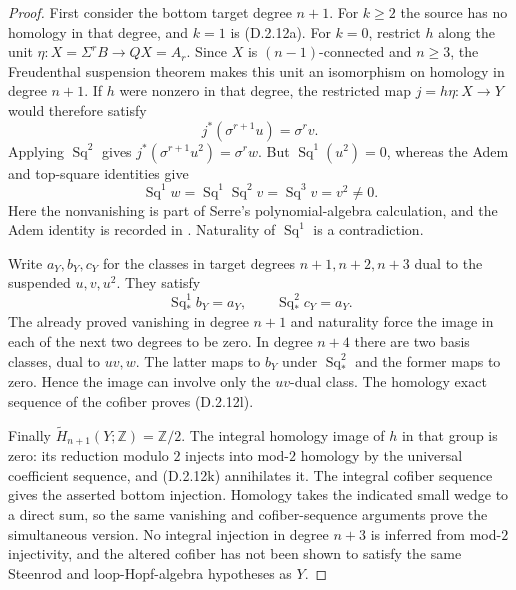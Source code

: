 \begin{proof}
First consider the bottom target degree $n+1$. For $k\geq2$
the source has no homology in that degree, and $k=1$ is
\textup{(D.2.12a)}. For $k=0$, restrict $h$ along the unit
$\eta:X=\Sigma^rB\to QX=A_r$. Since $X$ is
$(n-1)$-connected and $n\geq3$, the Freudenthal suspension
theorem \cite[Corollary~4.24]{FGHHatcher2002} makes this unit an isomorphism on homology in degree
$n+1$. If $h$ were nonzero in that degree, the restricted map
$j=h\eta:X\to Y$ would therefore satisfy
\[
 j^*(\sigma^{r+1}u)=\sigma^rv.
\]
Applying $\operatorname{Sq}^2$ gives
$j^*(\sigma^{r+1}u^2)=\sigma^rw$.
But $\operatorname{Sq}^1(u^2)=0$, whereas the Adem and
top-square identities give
\[
 \operatorname{Sq}^1w
 =\operatorname{Sq}^1\operatorname{Sq}^2v
 =\operatorname{Sq}^3v=v^2\ne0.
\]
Here the nonvanishing is part of Serre's polynomial-algebra
calculation, and the Adem identity is recorded in
\cite[\S4, no.~32.2, p.~224]{I_Serre1953}.
Naturality of $\operatorname{Sq}^1$ is a contradiction.

Write $a_Y,b_Y,c_Y$ for the classes in target degrees
$n+1,n+2,n+3$ dual to the suspended $u,v,u^2$.
They satisfy
\[
 \operatorname{Sq}_*^1b_Y=a_Y,
 \qquad\operatorname{Sq}_*^2c_Y=a_Y.
\]
The already proved vanishing in degree $n+1$ and naturality
force the image in each of the next two degrees to be zero.
In degree $n+4$ there are two basis classes, dual to $uv,w$.
The latter maps to $b_Y$ under $\operatorname{Sq}_*^2$ and
the former maps to zero. Hence the image can involve only
the $uv$-dual class. The homology exact sequence of the
cofiber proves \textup{(D.2.12l)}.

Finally $\widetilde H_{n+1}(Y;\mathbb Z)=\mathbb Z/2$.
The integral homology image of $h$ in that group is zero:
its reduction modulo $2$ injects into mod-$2$ homology by
the universal coefficient sequence, and
\textup{(D.2.12k)} annihilates it. The integral cofiber
sequence gives the asserted bottom injection. Homology takes
the indicated small wedge to a direct sum, so the same
vanishing and cofiber-sequence arguments prove the simultaneous
version. No integral
injection in degree $n+3$ is inferred from mod-$2$
injectivity, and the altered cofiber has not been shown to
satisfy the same Steenrod and loop-Hopf-algebra hypotheses
as $Y$.
\end{proof}
